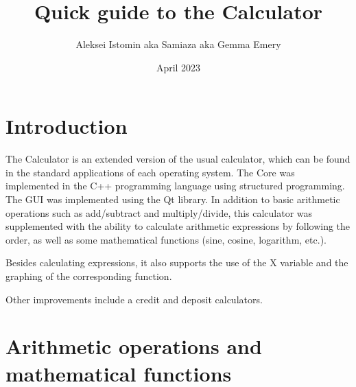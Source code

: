 \documentclass{article}
\title{Quick guide to the Calculator}
\author{Aleksei Istomin aka Samiaza aka Gemma Emery}
\date{April 2023}
\begin{document}
\maketitle
\pagebreak



\section{Introduction}
The Calculator is an extended version of the usual calculator, which can be found in the standard applications of each operating system. The Core was implemented in the C++ programming language using structured programming. The GUI was implemented using the Qt library. In addition to basic arithmetic operations such as add/subtract and multiply/divide, this calculator was supplemented with the ability to calculate arithmetic expressions by following the order, as well as some mathematical functions (sine, cosine, logarithm, etc.).

Besides calculating expressions, it also supports the use of the X variable and the graphing of the corresponding function.

Other improvements include a credit and deposit calculators.


\section{Arithmetic operations and mathematical functions}
\end{document}
